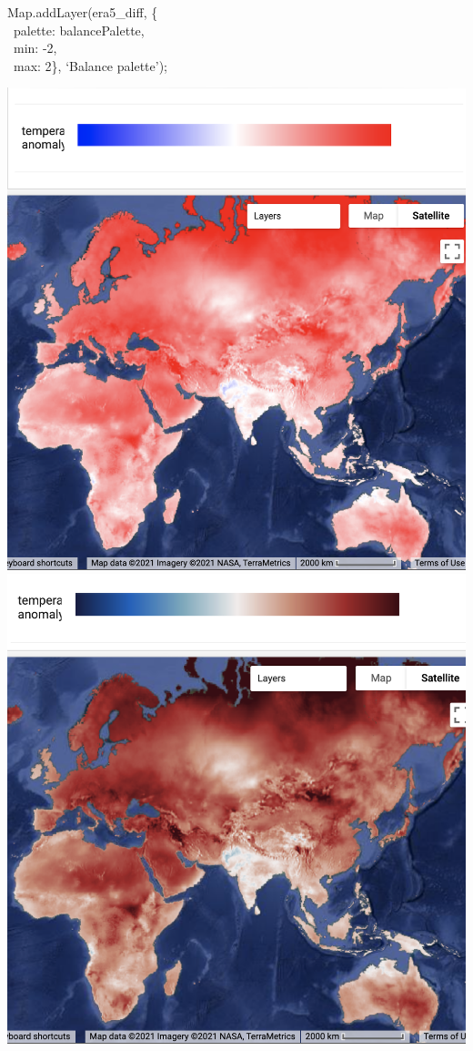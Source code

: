 \documentclass[
  letterpaper,
  DIV=11,
  numbers=noendperiod]{scrreprt}
\begin{document}
Map.addLayer(era5\_diff, \{\\
\hspace*{0.333em} ~palette: balancePalette,\\
\hspace*{0.333em} ~min: -2,\\
\hspace*{0.333em} ~max: 2\}, `Balance palette');

\includegraphics{./F6/image66.png}\includegraphics{./F6/image53.png}
\end{document}
